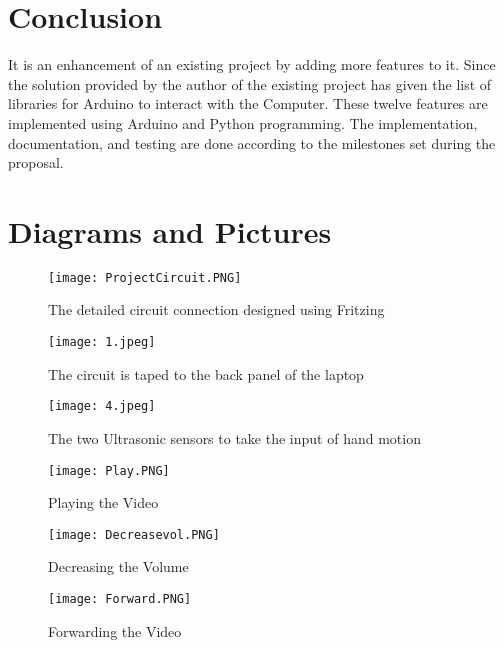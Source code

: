 \documentclass[12pt,journal]{IEEEtran}
\begin{document}
\section{Conclusion}
It is an enhancement of an existing project by adding more features to it. Since the solution provided by the author of the existing project has given the list of libraries for Arduino to interact with the Computer. These twelve features are implemented using Arduino and Python programming. The implementation, documentation, and testing are done according to the milestones set during the proposal.
\newpage
\appendices

\section{Diagrams and Pictures}
\begin{figure}[h]
\centering
  \texttt{[image: ProjectCircuit.PNG]}
  \caption{The detailed circuit connection designed using Fritzing}
  \label{fig:img1}
\end{figure}
\newpage

\begin{figure}[h]
\centering
  \texttt{[image: 1.jpeg]}
  \caption{The circuit is taped to the back panel of the laptop}
  \label{fig:img1}
\end{figure}

\begin{figure}[h]
\centering
  \texttt{[image: 4.jpeg]}
  \caption{The two Ultrasonic sensors to take the input of hand motion}
  \label{fig:img1}
\end{figure}

\begin{figure}[h]
\centering
  \texttt{[image: Play.PNG]}
  \caption{Playing the Video}
  \label{fig:img1}
\end{figure}
\begin{figure}[h]
\centering
  \texttt{[image: Decreasevol.PNG]}
  \caption{Decreasing the Volume}
  \label{fig:img1}
\end{figure}
\begin{figure}[h]
\centering
  \texttt{[image: Forward.PNG]}
  \caption{Forwarding the Video}
  \label{fig:img1}
\end{figure}

\newpage
\medskip
\end{document}
